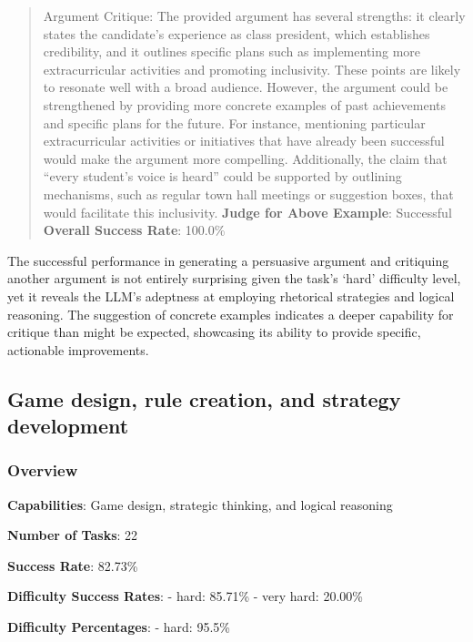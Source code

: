 \documentclass[fleqn,10pt]{wlscirep}
\begin{document}
\begin{quote}
Argument Critique: The provided argument has several strengths: it
clearly states the candidate's experience as class president, which
establishes credibility, and it outlines specific plans such as
implementing more extracurricular activities and promoting inclusivity.
These points are likely to resonate well with a broad audience. However,
the argument could be strengthened by providing more concrete examples
of past achievements and specific plans for the future. For instance,
mentioning particular extracurricular activities or initiatives that
have already been successful would make the argument more compelling.
Additionally, the claim that ``every student's voice is heard'' could be
supported by outlining mechanisms, such as regular town hall meetings or
suggestion boxes, that would facilitate this inclusivity. \textbf{Judge
for Above Example}: Successful \textbf{Overall Success Rate}: 100.0\%
\end{quote}

The successful performance in generating a persuasive argument and
critiquing another argument is not entirely surprising given the task's
`hard' difficulty level, yet it reveals the LLM's adeptness at employing
rhetorical strategies and logical reasoning. The suggestion of concrete
examples indicates a deeper capability for critique than might be
expected, showcasing its ability to provide specific, actionable
improvements.

\hypertarget{game-design-rule-creation-and-strategy-development}{%
\subsection{Game design, rule creation, and strategy
development}\label{game-design-rule-creation-and-strategy-development}}

\hypertarget{overview-16}{%
\subsubsection{Overview}\label{overview-16}}

\textbf{Capabilities}: Game design, strategic thinking, and logical
reasoning

\textbf{Number of Tasks}: 22

\textbf{Success Rate}: 82.73\%

\textbf{Difficulty Success Rates}: - hard: 85.71\% - very hard: 20.00\%

\textbf{Difficulty Percentages}: - hard: 95.5\%
\end{document}

